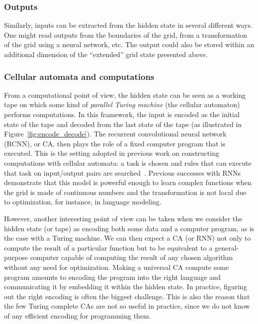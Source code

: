 \subsubsection{Outputs}

Similarly, inputs can be extracted from the hidden state in several different
ways. One might read outputs from the boundaries of the grid, from a
transformation of the grid using a neural network, etc. The output could also be
stored within an additional dimension of the ``extended'' grid state presented
above.

\subsubsection{Cellular automata and computations}

From a computational point of view, the hidden state can be seen as a working
tape on which some kind of \emph{parallel Turing machine} (the cellular automaton)
performs computations. In this framework, the input is encoded as the
initial state of the tape and decoded from the last state of the tape (as
illustrated in Figure~\ref{fig:encode_decode}). The recurrent convolutional
neural network (RCNN), or \ac{CA}, then plays the role of a fixed computer
program that is executed. This is the setting adopted in previous work on
constructing computations with cellular automata: a task is chosen and rules that 
can execute that task on input/output pairs
are searched~\parencite{mitchellComputationCellularAutomata2005}. Previous successes
with \acp{RNN} demonstrate that this model is powerful enough to learn complex
functions when the grid is made of continuous numbers and the transformation is
not local due to optimization, for instance, in language modeling.

However, another interesting point of view can be taken when we consider the
hidden state (or tape) as encoding both some data and a computer program, as is
the case with a Turing machine. We can then expect a \ac{CA} (or \ac{RNN}) not
only to compute the result of a particular function but to be equivalent to a
general-purpose computer capable of computing the result of any chosen algorithm
without any need for optimization. Making a universal \ac{CA} compute some
program amounts to encoding the program into the right language and
communicating it by embedding it within the hidden state. In practice, figuring
out the right encoding is often the biggest challenge. This is also the reason
that the few Turing complete \acp{CA} are not so useful in practice, since we do
not know of any efficient encoding for programming them.

